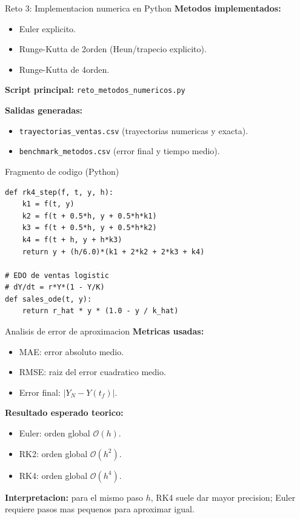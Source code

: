 \documentclass[aspectratio=169]{beamer}
\begin{document}
\begin{frame}{Reto 3: Implementacion numerica en Python}
\textbf{Metodos implementados:}
\begin{itemize}
  \item Euler explicito.
  \item Runge-Kutta de 2\textdegree orden (Heun/trapecio explicito).
  \item Runge-Kutta de 4\textdegree orden.
\end{itemize}

\textbf{Script principal:} \texttt{reto\_metodos\_numericos.py}

\vspace{0.2cm}
\textbf{Salidas generadas:}
\begin{itemize}
  \item \texttt{trayectorias\_ventas.csv} (trayectorias numericas y exacta).
  \item \texttt{benchmark\_metodos.csv} (error final y tiempo medio).
\end{itemize}
\end{frame}

\begin{frame}[fragile]{Fragmento de codigo (Python)}
\begin{lstlisting}
def rk4_step(f, t, y, h):
    k1 = f(t, y)
    k2 = f(t + 0.5*h, y + 0.5*h*k1)
    k3 = f(t + 0.5*h, y + 0.5*h*k2)
    k4 = f(t + h, y + h*k3)
    return y + (h/6.0)*(k1 + 2*k2 + 2*k3 + k4)

# EDO de ventas logistic
# dY/dt = r*Y*(1 - Y/K)
def sales_ode(t, y):
    return r_hat * y * (1.0 - y / k_hat)
\end{lstlisting}
\end{frame}

\begin{frame}{Analisis de error de aproximacion}
\textbf{Metricas usadas:}
\begin{itemize}
  \item MAE: error absoluto medio.
  \item RMSE: raiz del error cuadratico medio.
  \item Error final: $|Y_N - Y(t_f)|$.
\end{itemize}

\vspace{0.2cm}
\textbf{Resultado esperado teorico:}
\begin{itemize}
  \item Euler: orden global $\mathcal{O}(h)$.
  \item RK2: orden global $\mathcal{O}(h^2)$.
  \item RK4: orden global $\mathcal{O}(h^4)$.
\end{itemize}

\textbf{Interpretacion:} para el mismo paso $h$, RK4 suele dar mayor precision; Euler requiere pasos mas pequenos para aproximar igual.
\end{frame}
\end{document}
